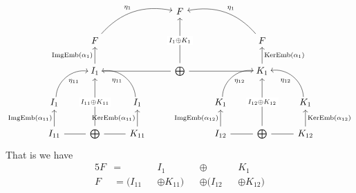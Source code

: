 \[
\begin{tikzcd}
                                                                   &                                                                   &                                                                    & F                                                      &                                                                    &                                                                    &                                                                     \\
                                                                   & F \arrow[rru, "\eta_{1}", bend left]                              &                                                                    &                                                        &                                                                    & F \arrow[llu, "\eta_{1}"', bend right]                             &                                                                     \\
                                                                   & I_{1} \arrow[u, "\mathrm{ImgEmb}(\alpha_{1})"] \arrow[rr, dash] &                                                                    & \bigoplus \arrow[uu, "I_{1} \oplus K_{1}" description] &                                                                    & K_{1} \arrow[u, "\mathrm{KerEmb}(\alpha_{1})"'] \arrow[ll, dash] &                                                                     \\
I_{1} \arrow[ru, "\eta_{11}"', bend left=49, shift right]           &                                                                   & I_{1} \arrow[lu, "\eta_{11}", bend right=49, shift left]           &                                                        & K_{1} \arrow[ru, "\eta_{12}"', bend left=49, shift right]                        &                                                                    & K_{1} \arrow[lu, "\eta_{12}", bend right=49, shift left]                        \\
I_{11} \arrow[u, "\mathrm{ImgEmb}(\alpha_{11})"] \arrow[r, dash] & \bigoplus \arrow[uu, "I_{11}\oplus K_{11}" description]           & K_{11} \arrow[u, "\mathrm{KerEmb}(\alpha_{11})"] \arrow[l, dash] &                                                        & I_{12} \arrow[u, "\mathrm{ImgEmb}(\alpha_{12})"] \arrow[r, dash] & \bigoplus \arrow[uu, "I_{12} \oplus K_{12}" description]           & K_{12} \arrow[u, "\mathrm{KerEmb}(\alpha_{12})"'] \arrow[l, dash]
\end{tikzcd}
\]
That is we have 
\begin{alignat}{5}
F &=  &&I_{1} &&\oplus &&K_{1} \\
F &= (I_{11} &&\oplus K_{11}) &&\oplus (I_{12} &&\oplus K_{12})
\end{alignat}


